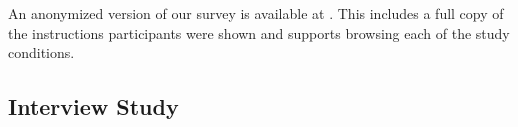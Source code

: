 \documentclass{egpubl}
\newcommand\asLink[2]{\textcolor{linkColor}{\href{#1}{\ul{#2}}}}
\newcommand{\linkToStudy}{\asLink{https://submitterpaper.github.io/study/Upset-Alttext-User-Survey/0}}
\begin{document}
An anonymized version of our survey is available at \linkToStudy{}. This includes a full copy of the instructions participants were shown and supports browsing each of the study conditions.

















































































\subsection{Interview Study}
\end{document}
